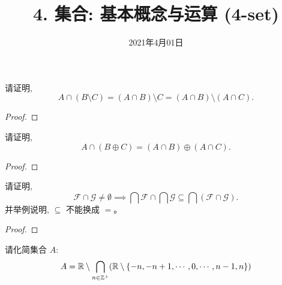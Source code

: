 \documentclass[a4paper, justified]{tufte-handout}
\title{4. 集合: 基本概念与运算 (4-set)}
\date{2021年4月01日}
\begin{document}
\maketitle
\noplagiarism %
\begin{abstract}
\end{abstract}
\beginrequired

\begin{problem}
  请证明,
  \[
    A \cap (B \setminus C) = (A \cap B) \setminus C
                            = (A \cap B) \setminus (A \cap C).
  \]
\end{problem}

\begin{proof}
\end{proof}

\begin{problem}
  请证明,
  \[
    A \cap (B \oplus C) = (A \cap B) \oplus (A \cap C).
  \]
\end{problem}

\begin{proof}
\end{proof}

\begin{problem}
  请证明,
  \[
    \mathcal{F} \cap \mathcal{G} \neq \emptyset \implies
      \bigcap \mathcal{F} \cap \bigcap \mathcal{G} \subseteq \bigcap (\mathcal{F} \cap \mathcal{G}).
  \]
  并举例说明, $\subseteq$ 不能换成 $=$。
\end{problem}

\begin{proof}
\end{proof}

\begin{problem}
  请化简集合 $A$:
  \[
    A = \mathbb{R} \setminus \bigcap_{n \in \mathbb{Z}^{+}} (\mathbb{R} \setminus \{-n, -n+1, \cdots, 0, \cdots, n-1, n\})
  \]
\end{problem}
\end{document}
